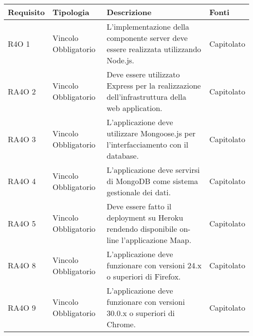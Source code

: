       \begin{center}
      \bgroup
      \def\arraystretch{1.8}
      \begin{longtable}{ | l | p{2cm} | p{5cm} | p{1.7cm} |}
    
      \cellcolor[gray]{0.9} \textbf{Requisito} & \cellcolor[gray]{0.9} \textbf{Tipologia} 
      & \cellcolor[gray]{0.9} \textbf{Descrizione} & \cellcolor[gray]{0.9} \textbf{Fonti} \\ \hline
      
        R4O 1 & Vincolo \newline  Obbligatorio  & L’implementazione della componente server deve essere realizzata utilizzando Node.js. &  Capitolato \newline  \\ \hline      
        RA4O 2 & Vincolo \newline  Obbligatorio  & Deve essere utilizzato Express per la realizzazione dell’infrastruttura della web application. &  Capitolato \newline  \\ \hline      
        RA4O 3 & Vincolo \newline  Obbligatorio  & L’applicazione deve utilizzare Mongoose.js per l’interfacciamento con il database. &  Capitolato \newline  \\ \hline      
        RA4O 4 & Vincolo \newline  Obbligatorio  & L’applicazione deve servirsi di  MongoDB come sistema gestionale dei dati. &  Capitolato \newline  \\ \hline      
        RA4O 5 & Vincolo \newline  Obbligatorio  & Deve essere fatto il deployment su Heroku rendendo disponibile on-line l’applicazione Maap. &  Capitolato \newline  \\ \hline      
        RA4O 8 & Vincolo \newline  Obbligatorio  & L’applicazione deve funzionare con versioni 24.x o superiori di Firefox. &  Capitolato \newline  \\ \hline      
        RA4O 9 & Vincolo \newline  Obbligatorio  & L’applicazione deve funzionare con versioni 30.0.x o superiori di Chrome. &  Capitolato \newline  \\ \hline
      \end{longtable}
      \egroup
      \end{center}  
\clearpage

